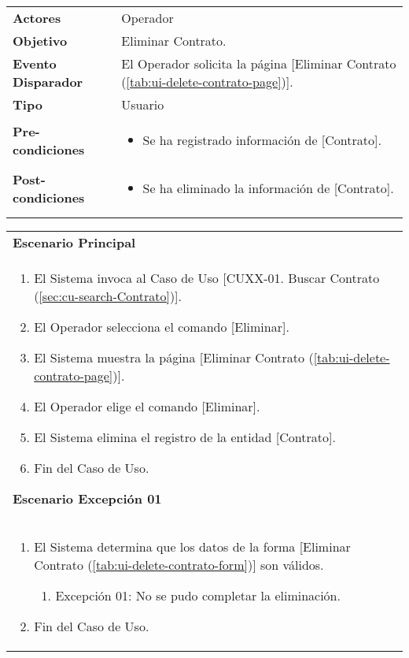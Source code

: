 	\begin{tabular}{ p{3.5cm} p{11.5cm} }
		\textbf{Actores} & Operador\\
		\textbf{Objetivo} & Eliminar Contrato.\\
		\textbf{Evento Disparador} & El Operador solicita la p\'agina [Eliminar Contrato (\ref{tab:ui-delete-contrato-page})].\\
		\textbf{Tipo} & Usuario\\
		\textbf{Pre-condiciones} &
			\begin{minipage}[t]{0.6\textwidth}
			\begin{itemize}[noitemsep,nolistsep]
			\setlength{\itemindent}{-.5cm}
				\item Se ha registrado informaci\'on de [Contrato].
			\end{itemize}
			\end{minipage} \\
		\textbf{Post-condiciones} &
			\begin{minipage}[t]{0.6\textwidth}
			\begin{itemize}[noitemsep,nolistsep]
			\setlength{\itemindent}{-.5cm}
				\item Se ha eliminado la informaci\'on de [Contrato].
			\end{itemize}
			\end{minipage} \\
		\\
	\end{tabular}
	
	\begin{tabular}{ p{15.5cm} }
		\textbf{Escenario Principal} \\
		\begin{enumerate}
			\item El Sistema invoca al Caso de Uso [CUXX-01. Buscar Contrato (\ref{sec:cu-search-Contrato})].
			\item El Operador selecciona el comando [Eliminar].
			\item El Sistema muestra la p\'agina [Eliminar Contrato (\ref{tab:ui-delete-contrato-page})].
			\item El Operador elige el comando [Eliminar].
			\item El Sistema elimina el registro de la entidad [Contrato].
			\item Fin del Caso de Uso.
		\end{enumerate}
		\textbf{Escenario Excepci\'on 01} \\
		\begin{enumerate}
		   \item El Sistema determina que los datos de la forma [Eliminar Contrato (\ref{tab:ui-delete-contrato-form})] son v\'alidos.
		   	\begin{enumerate}
		   		\item Excepci\'on 01: No se pudo completar la eliminaci\'on.
		    \end{enumerate}
		   \item Fin del Caso de Uso.
		\end{enumerate}
	\end{tabular}
	
